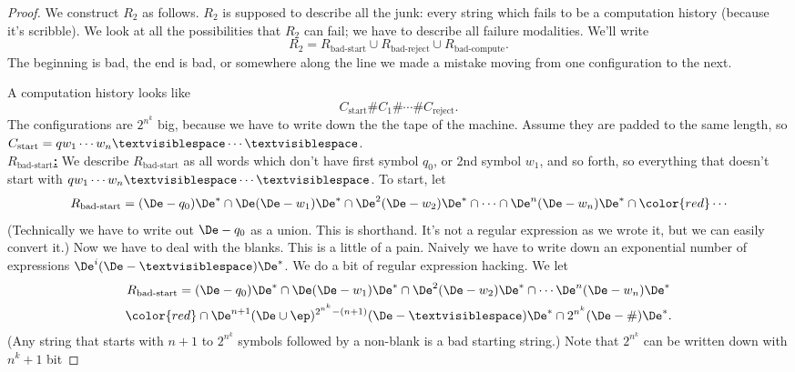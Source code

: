 \begin{proof}
We construct $R_2$ as follows. $R_2$ is supposed to describe all the junk: every string which fails to be a computation history (because it's scribble). We look at all the possibilities that $R_2$ can fail; we have to describe all failure modalities. We'll write
\[
R_2=R_{\text{bad-start}}\cup R_{\text{bad-reject}}\cup R_{\text{bad-compute}}.
\]
The beginning is bad, the end is bad, or somewhere along the line we made a mistake moving from one configuration to the next.

A computation history looks like
\[
C_{\text{start}}\#C_1\#\cdots \# C_{\text{reject}}.
\]
The configurations are $2^{n^k}$ big, because we have to write down the the tape of the machine. Assume they are padded to the same length, so $C_{\text{start}}=qw_1\cdots w_n\textvisiblespace\cdots \textvisiblespace$.\\

\noindent
\ul{\textbf{$R_{\text{bad-start}}$:}}
We describe $R_{\text{bad-start}}$ as all words which don't have first symbol $q_0$, or 2nd symbol $w_1$, and so forth, so everything that doesn't start with $qw_1\cdots w_n\textvisiblespace\cdots \textvisiblespace$. To start, let 
\[
R_{\text{bad-start}}=(\De-q_0)\De^*\cap \De(\De-w_1)\De^*
\cap \De^2(\De-w_2)\De^*\cap \cdots \cap \De^n(\De-w_n)\De^*\cap {\color{red}\cdots} 
\]
(Technically we have to write out $\De-q_0$ as a union. This is shorthand. It's not a regular expression as we wrote it, but we can easily convert it.)
Now we have to deal with the blanks. This is a little of a pain. Naively we have to write down an exponential number of expressions $\De^i(\De-\textvisiblespace) \De^*$. We do a bit of regular expression hacking.
We let 
\begin{gather*}
R_{\text{bad-start}}=(\De-q_0)\De^*\cap \De(\De-w_1)\De^*
\cap \De^2(\De-w_2)\De^*\cap \cdots \De^n(\De-w_n)\De^*\\
 {\color{red}\cap
\De^{n+1}(\De\cup \ep)^{2^{n^k}-(n+1)}(\De-\textvisiblespace)\De^*\cap 2^{n^k}(\De-\#)\De^*
}.
\end{gather*}
(Any string that starts with $n+1$ to $2^{n^k}$ symbols followed by a non-blank is a bad starting string.) Note that $2^{n^k}$ can be written down with $n^k+1$ bit


\end{proof}
